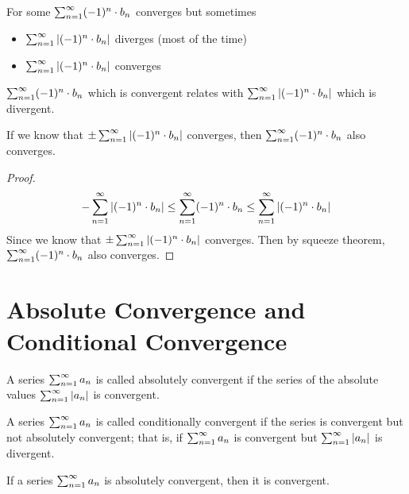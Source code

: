 \begin{remark}
  For some \(\sum_{n=1}^{\infty} (-1)^n \cdot b_n\) converges but sometimes
  \begin{itemize}
    \item \(\sum_{n=1}^{\infty} |(-1)^n \cdot b_n|\) diverges (most of the time)
    \item \(\sum_{n=1}^{\infty} |(-1)^n \cdot b_n|\) converges
  \end{itemize}
  \(\sum_{n=1}^{\infty} (-1)^n \cdot b_n\) which is convergent relates with \(\sum_{n=1}^{\infty} |(-1)^n \cdot b_n|\) which is divergent.
\end{remark}

\begin{lemma}
  If we know that \(\pm \sum_{n=1}^{\infty} |(-1)^n \cdot b_n|\) converges, then \(\sum_{n=1}^{\infty} (-1)^n \cdot b_n\) also converges.
\end{lemma}

\begin{proof}
  \[
    - \sum_{n=1}^{\infty} |(-1)^n \cdot b_n| \le \sum_{n=1}^{\infty} (-1)^n \cdot b_n \le \sum_{n=1}^{\infty} |(-1)^n \cdot b_n|
  \]
  Since we know that \(\pm \sum_{n=1}^{\infty} |(-1)^n \cdot b_n|\) converges. Then by squeeze theorem, \(\sum_{n=1}^{\infty} (-1)^n \cdot b_n\) also converges.
\end{proof}

\section{Absolute Convergence and Conditional Convergence}

\begin{definition}
  A series \(\sum_{n=1}^{\infty} a_n\) is called absolutely convergent if the series of the absolute values \(\sum_{n=1}^{\infty} |a_n|\) is convergent.
\end{definition}

\begin{definition}
  A series \(\sum_{n=1}^{\infty} a_n\) is called conditionally convergent if the series is convergent but not absolutely convergent; that is, if \(\sum_{n=1}^{\infty} a_n\) is convergent but \(\sum_{n=1}^{\infty} |a_n|\) is divergent.
\end{definition}

\begin{theorem}
  If a series \(\sum_{n=1}^{\infty} a_n\) is absolutely convergent, then it is convergent.
\end{theorem}


